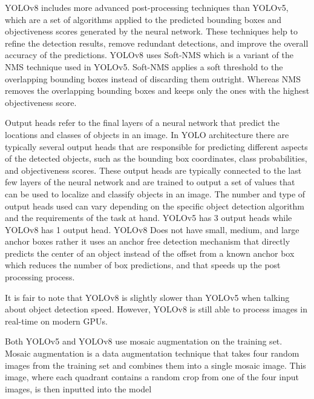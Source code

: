 \documentclass[10pt,twocolumn,letterpaper]{article}
\begin{document}
YOLOv8 includes more advanced post-processing techniques than YOLOv5, which are a set of algorithms applied to the predicted bounding boxes and objectiveness scores generated by the neural network. These techniques help to refine the detection results, remove redundant detections, and improve the overall accuracy of the predictions. YOLOv8 uses Soft-NMS which is a variant of the NMS technique used in YOLOv5. Soft-NMS applies a soft threshold to the overlapping bounding boxes instead of discarding them outright. Whereas NMS removes the overlapping bounding boxes and keeps only the ones with the highest objectiveness score.

Output heads refer to the final layers of a neural network that predict the locations and classes of objects in an image. In YOLO architecture there are typically several output heads that are responsible for predicting different aspects of the detected objects, such as the bounding box coordinates, class probabilities, and objectiveness scores. These output heads are typically connected to the last few layers of the neural network and are trained to output a set of values that can be used to localize and classify objects in an image. The number and type of output heads used can vary depending on the specific object detection algorithm and the requirements of the task at hand. YOLOv5 has 3 output heads while YOLOv8 has 1 output head. YOLOv8 Does not have small, medium, and large anchor boxes rather it uses an anchor free detection mechanism that directly predicts the center of an object instead of the offset from a known anchor box which reduces the number of box predictions, and that speeds up the post processing process.

It is fair to note that YOLOv8 is slightly slower than YOLOv5 when talking about object detection speed. However, YOLOv8 is still able to process images in real-time on modern GPUs.

Both YOLOv5 and YOLOv8 use mosaic augmentation on the training set. Mosaic augmentation is a data augmentation technique that takes four random images from the training set and combines them into a single mosaic image. This image, where each quadrant contains a random crop from one of the four input images, is then inputted into the model ~\cite{MosaicAug}

\end{document}
